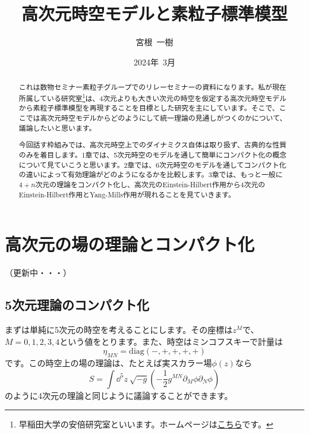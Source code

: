 \documentclass[unicode,a4paper,11pt]{ltjsarticle}
\title{高次元時空モデルと素粒子標準模型}
\author{宮根\ 一樹}
\date{2024年\ 3月}
\begin{document}
\maketitle

\begin{abstract}
   これは数物セミナー素粒子グループでのリレーセミナーの資料になります。私が現在所属している研究室\footnote{
      早稲田大学の安倍研究室といいます。ホームページは\href{http://www.hep.phys.waseda.ac.jp/index-j.html}{こちら}です。
   }は、4次元よりも大きい次元の時空を仮定する高次元時空モデルから素粒子標準模型を再現することを目標とした研究を主にしています。そこで、ここでは高次元時空モデルからどのようにして統一理論の見通しがつくのかについて、議論したいと思います。

   今回話す枠組みでは、高次元時空上でのダイナミクス自体は取り扱ず、古典的な性質のみを着目します。1章では、5次元時空のモデルを通して簡単にコンパクト化の概念について見ていこうと思います。2章では、6次元時空のモデルを通してコンパクト化の違いによって有効理論がどのようになるかを比較します。3章では、もっと一般に$4+n$次元の理論をコンパクト化し、高次元のEinstein-Hilbert作用から4次元のEinstein-Hilbert作用とYang-Mills作用が現れることを見ていきます。
\end{abstract}

\tableofcontents

\clearpage

\section{高次元の場の理論とコンパクト化}

（更新中・・・）


\subsection{5次元理論のコンパクト化}

まずは単純に5次元の時空を考えることにします。その座標は$z^{M}$で、$M=0,1,2,3,4$という値をとります。また、時空はミンコフスキーで計量は
\begin{equation}
   \eta_{MN}
   =
   \mathrm{diag}(-,+,+,+,+)
\end{equation}
です。この時空上の場の理論は、たとえば実スカラー場$\phi(z)$なら
\begin{equation}
   S
   =
   \int\dd^5 z\ \sqrt{-g}
   \left(
   -\frac{1}{2}
   g^{MN}\partial_{M}\phi\partial_{N}\phi
   \right)
   \label{eqn:action_5d_real_scalar}
\end{equation}
のように4次元の理論と同じように議論することができます。
\end{document}
